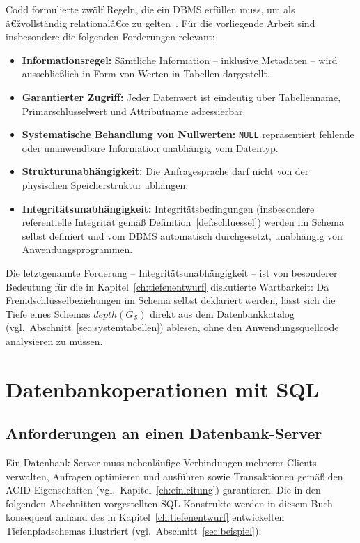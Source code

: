 ﻿\documentclass[a4paper,12pt]{report}
\theoremstyle{definition}
\theoremstyle{remark}
\newcommand{\depth}{\mathit{depth}}
\begin{document}
Codd formulierte zwölf Regeln, die ein DBMS erfüllen muss, um als
â€žvollständig relationalâ€œ zu gelten~\cite{Codd1970,Codd1974}. Für die
vorliegende Arbeit sind insbesondere die folgenden Forderungen
relevant:

\begin{itemize}
  \item \textbf{Informationsregel:} Sämtliche Information -- inklusive
    Metadaten -- wird ausschließlich in Form von Werten in Tabellen
    dargestellt.
  \item \textbf{Garantierter Zugriff:} Jeder Datenwert ist eindeutig
    über Tabellenname, Primärschlüsselwert und Attributname adressierbar.
  \item \textbf{Systematische Behandlung von Nullwerten:} \texttt{NULL}
    repräsentiert fehlende oder unanwendbare Information unabhängig vom
    Datentyp.
  \item \textbf{Strukturunabhängigkeit:} Die Anfragesprache darf nicht
    von der physischen Speicherstruktur abhängen.
  \item \textbf{Integritätsunabhängigkeit:} Integritätsbedingungen
    (insbesondere referentielle Integrität gemäß
    Definition~\ref{def:schluessel}) werden im Schema selbst definiert
    und vom DBMS automatisch durchgesetzt, unabhängig von
    Anwendungsprogrammen.
\end{itemize}

Die letztgenannte Forderung -- Integritätsunabhängigkeit -- ist von
besonderer Bedeutung für die in Kapitel~\ref{ch:tiefenentwurf}
diskutierte Wartbarkeit: Da Fremdschlüsselbeziehungen im Schema selbst
deklariert werden, lässt sich die Tiefe eines Schemas
$\depth(G_{\mathcal{S}})$ direkt aus dem Datenbankkatalog (vgl.\
Abschnitt~\ref{sec:systemtabellen}) ablesen, ohne den
Anwendungsquellcode analysieren zu müssen.

\chapter{Datenbankoperationen mit SQL}
\label{ch:sql}

\section{Anforderungen an einen Datenbank-Server}

Ein Datenbank-Server muss nebenläufige Verbindungen mehrerer Clients
verwalten, Anfragen optimieren und ausführen sowie Transaktionen gemäß
den ACID-Eigenschaften (vgl.\ Kapitel~\ref{ch:einleitung}) garantieren.
Die in den folgenden Abschnitten vorgestellten SQL-Konstrukte werden in
diesem Buch konsequent anhand des in Kapitel~\ref{ch:tiefenentwurf}
entwickelten Tiefenpfadschemas illustriert (vgl.\
Abschnitt~\ref{sec:beispiel}).
\end{document}
